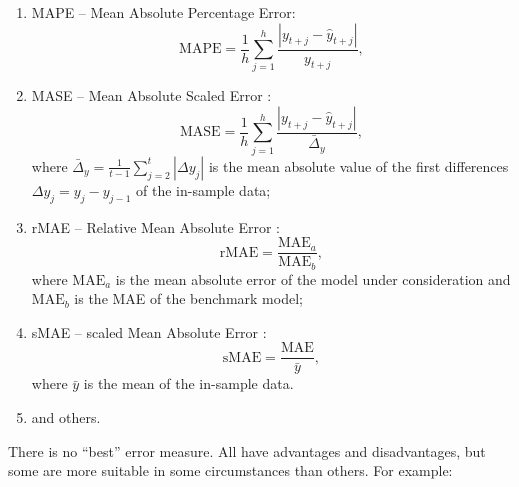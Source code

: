 \documentclass[
]{book}
\providecommand{\tightlist}{%
  \setlength{\itemsep}{0pt}\setlength{\parskip}{0pt}}
\theoremstyle{definition}
\theoremstyle{definition}
\theoremstyle{definition}
\theoremstyle{definition}
\theoremstyle{remark}
\begin{document}
\begin{enumerate}
\def\labelenumi{\arabic{enumi}.}
\tightlist
\item
  MAPE -- Mean Absolute Percentage Error:
  \begin{equation}
   \mathrm{MAPE} = \frac{1}{h} \sum_{j=1}^h \frac{|y_{t+j} -\hat{y}_{t+j}|}{y_{t+j}},
   \label{eq:MAPE}
  \end{equation}
\item
  MASE -- Mean Absolute Scaled Error \citep{Hyndman2006}:
  \begin{equation}
   \mathrm{MASE} = \frac{1}{h} \sum_{j=1}^h \frac{|y_{t+j} -\hat{y}_{t+j}|}{\bar{\Delta}_y},
   \label{eq:MASE}
  \end{equation}
  where \(\bar{\Delta}_y = \frac{1}{t-1}\sum_{j=2}^t |\Delta y_{j}|\) is the mean absolute value of the first differences \(\Delta y_{j}=y_j-y_{j-1}\) of the in-sample data;
\item
  rMAE -- Relative Mean Absolute Error \citep{Davydenko2013}:
  \begin{equation}
   \mathrm{rMAE} = \frac{\mathrm{MAE}_a}{\mathrm{MAE}_b},
   \label{eq:rMAE}
  \end{equation}
  where \(\mathrm{MAE}_a\) is the mean absolute error of the model under consideration and \(\mathrm{MAE}_b\) is the MAE of the benchmark model;
\item
  sMAE -- scaled Mean Absolute Error \citep{Petropoulos2015}:
  \begin{equation}
   \mathrm{sMAE} = \frac{\mathrm{MAE}}{\bar{y}},
   \label{eq:sMAE}
  \end{equation}
  where \(\bar{y}\) is the mean of the in-sample data.
\item
  and others.
\end{enumerate}

There is no ``best'' error measure. All have advantages and disadvantages, but some are more suitable in some circumstances than others. For example:
\end{document}
